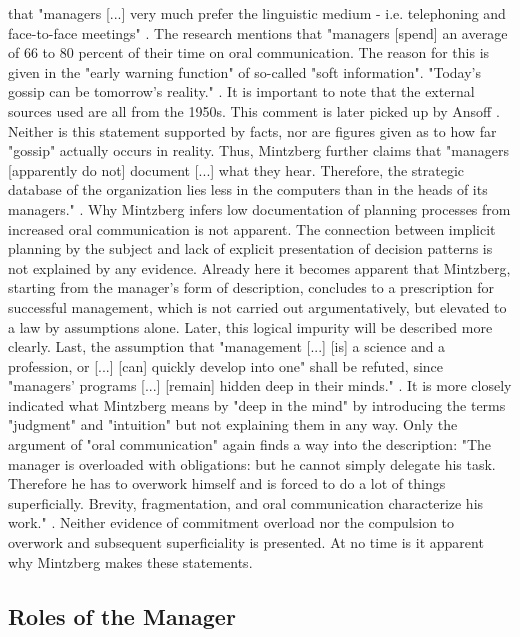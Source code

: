 \documentclass[a4paper,12pt]{article}
\begin{document}
that "managers [...] very much prefer the linguistic medium - i.e. telephoning
and face-to-face meetings" \cite[p. 26]{Mintzberg}. The research mentions that
"managers [spend] an average of 66 to 80 percent of their time on oral
communication. The reason for this is given in the "early warning function" of
so-called "soft information". "Today's gossip can be tomorrow's reality."
\cite[p. 27]{Mintzberg}. It is important to note that the external sources
used are all from the 1950s. This comment is later picked up by Ansoff
\cite{ansoff}.  Neither is this statement supported by facts, nor are figures
given as to how far "gossip" actually occurs in reality. Thus, Mintzberg
further claims that "managers [apparently do not] document [...] what they
hear. Therefore, the strategic database of the organization lies less in the
computers than in the heads of its managers." \cite[p. 27]{Mintzberg}. Why
Mintzberg infers low documentation of planning processes from increased oral
communication is not apparent. The connection between implicit planning by the
subject and lack of explicit presentation of decision patterns is not
explained by any evidence. Already here it becomes apparent that Mintzberg,
starting from the manager's form of description, concludes to a prescription
for successful management, which is not carried out argumentatively, but
elevated to a law by assumptions alone. Later, this logical impurity will be
described more clearly. Last, the assumption that "management [...] [is] a
science and a profession, or [...] [can] quickly develop into one"
{}\cite[p.28]{Mintzberg} shall be refuted, since "managers' programs [...]
[remain] hidden deep in their minds." \cite[p. 28]{Mintzberg}. It is more
closely indicated what Mintzberg means by "deep in the mind" by introducing
the terms "judgment" and "intuition" but not explaining them in any way. Only
the argument of "oral communication" again finds a way into the description:
"The manager is overloaded with obligations: but he cannot simply delegate his
task. Therefore he has to overwork himself and is forced to do a lot of things
superficially. Brevity, fragmentation, and oral communication characterize his
work." \cite[p. 28]{Mintzberg}. Neither evidence of commitment overload nor the
compulsion to overwork and subsequent superficiality is presented. At no time
is it apparent why Mintzberg makes these statements.

\subsection{Roles of the Manager}
\end{document}
